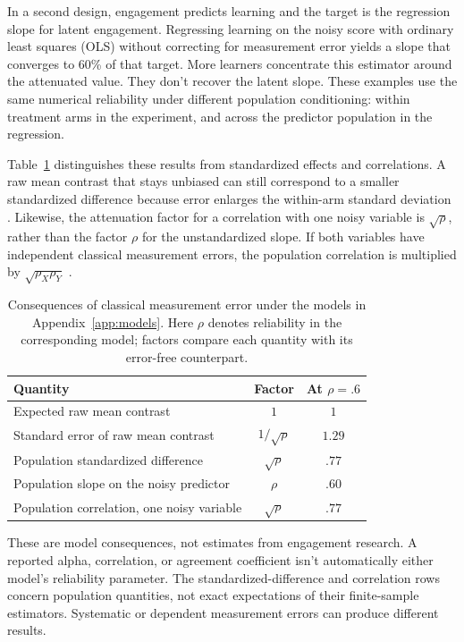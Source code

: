 \documentclass[12pt,twoside]{article}
\begin{document}
In a second design, engagement predicts learning and the target is the regression slope for latent engagement. Regressing learning on the noisy score with ordinary least squares (OLS) without correcting for measurement error yields a slope that converges to 60\% of that target. More learners concentrate this estimator around the attenuated value. They don't recover the latent slope. These examples use the same numerical reliability under different population conditioning: within treatment arms in the experiment, and across the predictor population in the regression.

Table~\ref{tab:attenuation} distinguishes these results from standardized effects and correlations. A raw mean contrast that stays unbiased can still correspond to a smaller standardized difference because error enlarges the within-arm standard deviation \citep{KarvelisDiaconescu2025}. Likewise, the attenuation factor for a correlation with one noisy variable is $\sqrt{\rho}$, rather than the factor $\rho$ for the unstandardized slope. If both variables have independent classical measurement errors, the population correlation is multiplied by $\sqrt{\rho_X\rho_Y}$ \citep[p.\ 254]{ZhaoPlonsky2024}.

\begin{table}[!htbp]
\centering
\caption{Consequences of classical measurement error under the models in Appendix~\ref{app:models}. Here $\rho$ denotes reliability in the corresponding model; factors compare each quantity with its error-free counterpart.}
\label{tab:attenuation}
\begin{tabular}{@{}lcc@{}}
\toprule
Quantity & Factor & At $\rho=.6$ \\
\midrule
Expected raw mean contrast & $1$ & $1$ \\
Standard error of raw mean contrast & $1/\sqrt{\rho}$ & $1.29$ \\
Population standardized difference & $\sqrt{\rho}$ & $.77$ \\
Population slope on the noisy predictor & $\rho$ & $.60$ \\
Population correlation, one noisy variable & $\sqrt{\rho}$ & $.77$ \\
\bottomrule
\end{tabular}
\end{table}

These are model consequences, not estimates from engagement research. A reported alpha, correlation, or agreement coefficient isn't automatically either model's reliability parameter. The standardized-difference and correlation rows concern population quantities, not exact expectations of their finite-sample estimators. Systematic or dependent measurement errors can produce different results.
\end{document}
